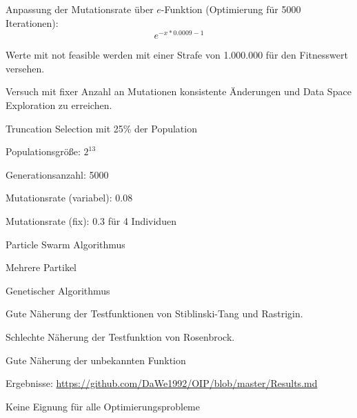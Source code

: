 \documentclass[t,8pt]{beamer}
\begin{document}
\begin{dwFrame}

	\begin{dwItemize}
		\item Anpassung der Mutationsrate über $e$-Funktion (Optimierung für 5000 Iterationen):\\
			\begin{equation*}
				e^{-x*0.0009-1}
			\end{equation*}
		\item Werte mit \glqq  not feasible\grqq{} werden mit einer Strafe von 1.000.000 für den Fitnesswert versehen.
		\item Versuch mit fixer Anzahl an Mutationen konsistente Änderungen und Data Space Exploration zu erreichen.
		\item Truncation Selection mit 25\% der Population
	\end{dwItemize}

	\vspace{2mm}

	\dwHeader{Parameter}

	\begin{dwItemize}
		\item Populationsgröße: $2^{13}$
		\item Generationsanzahl: 5000
		\item Mutationsrate (variabel): 0.08
		\item Mutationsrate (fix): 0.3 für 4 Individuen
	\end{dwItemize}

\end{dwFrame}


\begin{dwHeaderFrame}{Particle Swarm Algorithmus}
	\begin{dwItemize}
		\item Mehrere Partikel
	\end{dwItemize}
\end{dwHeaderFrame}


\begin{dwHeaderFrame}{Genetischer Algorithmus}
	\begin{dwItemize}
		\item Gute Näherung der Testfunktionen von Stiblinski-Tang und Rastrigin.
		\item Schlechte Näherung der Testfunktion von Rosenbrock.
		\item Gute Näherung der unbekannten Funktion
		\item Ergebnisse: \url{https://github.com/DaWe1992/OIP/blob/master/Results.md}
		\item Keine Eignung für alle Optimierungsprobleme
	\end{dwItemize}
\end{dwHeaderFrame}
\end{document}
